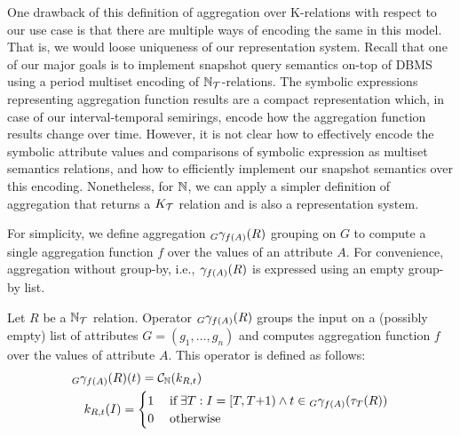 One drawback of this definition of aggregation over K-relations with
respect to our use case is that there are multiple ways of encoding
the same \SKrel{} in this model. That is, we would
loose uniqueness of our representation system.  Recall that one of our
major goals is to implement snapshot query semantics on-top of DBMS
using a period multiset encoding of
${{\mathbb{N}}}_{\mathcal{T}}$-relations.  The symbolic expressions
representing aggregation function results are a compact representation
which, in case of our interval-temporal semirings, encode how the
aggregation function results change over time.  However, it is not
clear how to effectively encode the symbolic attribute values and
comparisons of symbolic expression as multiset semantics relations,
and how to efficiently implement our snapshot semantics over this
encoding. Nonetheless, for ${\mathbb{N}}$, we can apply a simpler definition
of aggregation that returns a ${K}_{\mathcal{T}}$ relation and is
also a representation system.  

For simplicity, we define aggregation ${}_{G}\gamma_{f(A)}(R)$ grouping on $G$ to compute a single aggregation function $f$ over the values of an attribute $A$. For convenience, aggregation without group-by, i.e., ${}_{}\gamma_{f(A)}(R)$ is expressed using an empty group-by list.

\begin{defi}[Aggregation]\label{def:aggregation-nin}
 Let $R$ be a ${{\mathbb{N}}}_{\mathcal{T}}$ relation.  Operator ${}_{G}\gamma_{f(A)}(R)$ groups the input on a (possibly empty) list of attributes $G = (g_1, \ldots, g_n)$ and computes aggregation function $f$ over the values of attribute $A$.
  This operator is defined as follows:
  \begin{align*}
    &{}_{G}\gamma_{f(A)}(R)(t) = \mathcal{C}_{{{\mathbb{N}}}}(k_{R,t})\\
    &\quad k_{R,t} (I) =
    \begin{cases}
      1 &\thickspace\text{if}\thickspace \exists T: I = [T,T{+}1) \wedge t \in {}_{G}\gamma_{f(A)}(\tau_{T}(R))\\
      0 & \thickspace\text{otherwise}\thickspace\\
    \end{cases}
  \end{align*}
\end{defi}

